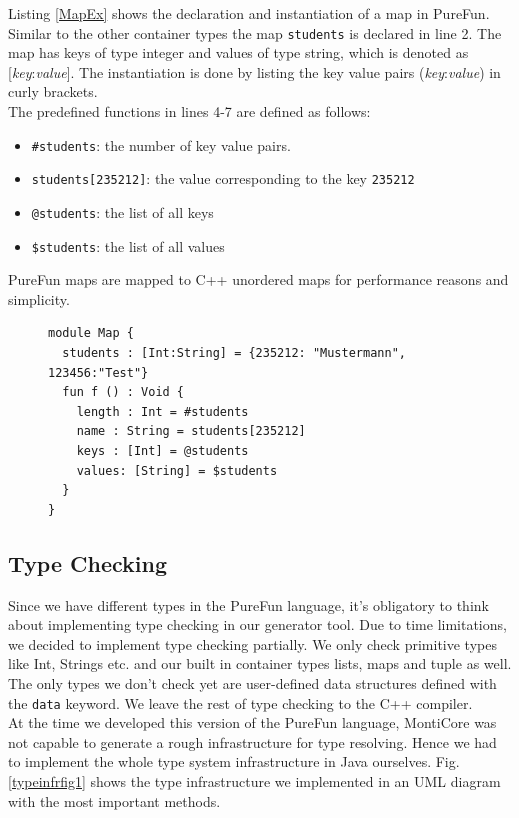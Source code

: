 Listing \ref{MapEx} shows the declaration and instantiation of a map in PureFun. Similar to the other container types the map \texttt{students} is declared in line 2. The map has keys of type integer and values of type string, which is denoted as [\textit{key}:\textit{value}]. The instantiation is done by listing the key value pairs (\textit{key}:\textit{value}) in curly brackets.\\
The predefined functions in lines 4-7 are defined as follows:
\begin{itemize}
\item \texttt{\#students}: the number of key value pairs.
\item \texttt{students[235212]}: the value corresponding to the key \texttt{235212}
\item \texttt{@students}: the list of all keys
\item \texttt{\$students}: the list of all values
\end{itemize}
PureFun maps are mapped to C++ unordered maps for performance reasons and simplicity.
\begin{figure}
\begin{lstlisting}[caption={PureFun code with a map and its predefined functions.},label={MapEx}]
module Map {
  students : [Int:String] = {235212: "Mustermann", 123456:"Test"}
  fun f () : Void {
    length : Int = #students
    name : String = students[235212]
    keys : [Int] = @students
    values: [String] = $students
  }
}
\end{lstlisting}
\end{figure}
\subsection{Type Checking}

Since we have different types in the PureFun language, it's obligatory to think about implementing type checking in our generator tool. Due to time limitations, we decided to implement type checking partially. We only check primitive types like Int, Strings etc. and our built in container types lists, maps and tuple as well. The only types we don't check yet are user-defined data structures defined with the \lstinline{data}{} keyword. We leave the rest of type checking to the C++ compiler.\\
At the time we developed this version of the PureFun language, MontiCore was not capable to generate a rough infrastructure for type resolving. Hence we had to implement the whole type system infrastructure in Java ourselves. Fig. \ref{typeinfrfig1} shows the type infrastructure we implemented in an UML diagram with the most important methods.

